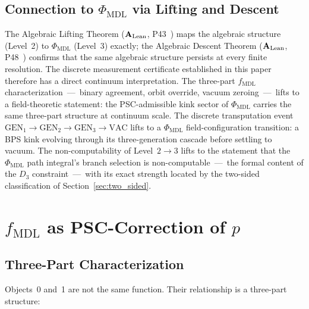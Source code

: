 \documentclass[11pt]{article}
\theoremstyle{remark}
\newcommand{\PHIMDL}{\ensuremath{\Phi_{\mathrm{MDL}}}}
\newcommand{\CMCA}{\text{CMCA}}
\newcommand{\fmdl}{\ensuremath{f_{\mathrm{MDL}}}}
\newcommand{\CatAL}{\ensuremath{\textbf{A}_{\rm Lean}}}
\begin{document}
\subsection{Connection to \boldmath$\PHIMDL$ via Lifting and Descent}
\label{sec:lifting}

The Algebraic Lifting Theorem (\CatAL, P43~\cite{SpivackCompleteness}) maps the
\CMCA{} algebraic structure (Level~2) to $\PHIMDL$ (Level~3) exactly; the
Algebraic Descent Theorem (\CatAL, P48~\cite{SpivackGTECompleteFramework})
confirms that the same algebraic structure persists at every finite resolution.
The discrete measurement certificate established in this paper therefore has a
direct continuum interpretation.
The three-part \fmdl{} characterization~---~binary agreement, orbit override,
vacuum zeroing~---~lifts to a field-theoretic statement: the PSC-admissible
kink sector of $\PHIMDL$ carries the same three-part structure at continuum
scale.
The discrete transputation event
$\mathrm{GEN}_1 \to \mathrm{GEN}_2 \to \mathrm{GEN}_3 \to \mathrm{VAC}$
lifts to a $\PHIMDL$ field-configuration transition: a BPS kink evolving
through its three-generation cascade before settling to vacuum.
The non-computability of Level~$2\to3$ lifts to the statement that the
$\PHIMDL$ path integral's branch selection is non-computable~---~the formal
content of the $D_3$ constraint~---~with its exact strength located by the
two-sided classification of Section~\ref{sec:two_sided}.

\section{\boldmath$\fmdl{}$ as PSC-Correction of $p$}
\label{sec:psc_correction}

\subsection{Three-Part Characterization}
\label{sec:three_part}

Objects~0 and~1 are not the same function. Their relationship is a
three-part structure:
\end{document}
